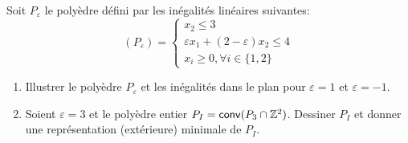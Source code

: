 \begin{td-exo}\,\\ %
	Soit \(P_{\varepsilon}\) le polyèdre défini par les inégalités linéaires suivantes:
    \begin{equation*}
        (P_{\varepsilon}) = 
        \begin{cases}
            x_2 \leq 3\\
            \varepsilon x_1 + (2 -\varepsilon) x_2 \leq 4\\
            x_i \geq 0,\forall i \in \{1, 2\}
        \end{cases}
    \end{equation*}
    \begin{enumerate}
        \item Illustrer le polyèdre \(P_\varepsilon\) et les inégalités dans le plan pour \(\varepsilon = 1\) et \(\varepsilon = -1\).

        \item Soient \(\varepsilon = 3\) et le polyèdre entier \(P_I = \mathsf{conv}(P_3 \cap \mathbb{Z}^2)\).
        Dessiner \(P_I\) et donner une représentation (extérieure) minimale de \(P_I\).
    \end{enumerate}
\end{td-exo}

